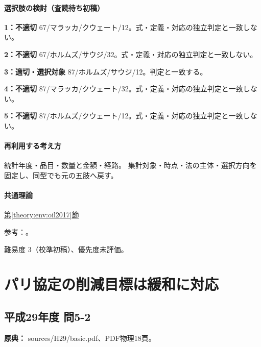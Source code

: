 \paragraph{選択肢の検討（査読待ち初稿）}\mbox{}\par

\noindent\textbf{1：不適切} 67/マラッカ/クウェート/12。式・定義・対応の独立判定と一致しない。\par

\noindent\textbf{2：不適切} 67/ホルムズ/サウジ/32。式・定義・対応の独立判定と一致しない。\par

\noindent\textbf{3：適切・選択対象} 87/ホルムズ/サウジ/12。判定と一致する。\par

\noindent\textbf{4：不適切} 87/マラッカ/クウェート/32。式・定義・対応の独立判定と一致しない。\par

\noindent\textbf{5：不適切} 87/ホルムズ/クウェート/12。式・定義・対応の独立判定と一致しない。\par

\paragraph{再利用する考え方} 統計年度・品目・数量と金額・経路。 集計対象・時点・法の主体・選択方向を固定し、同型でも元の五肢へ戻す。

\paragraph{共通理論} \hyperref[theory:env:oil2017]{第\ref*{theory:env:oil2017}節}

\par 参考：\cite{env59_energy2019}。

\par 難易度 3（校準初稿）、優先度未評価。

\section{パリ協定の削減目標は緩和に対応}

\subsection{平成29年度 問5-2}
\label{q:h29-reg-basic-5-2}

\noindent\textbf{原典：} sources/H29/basic.pdf、PDF物理18頁。

